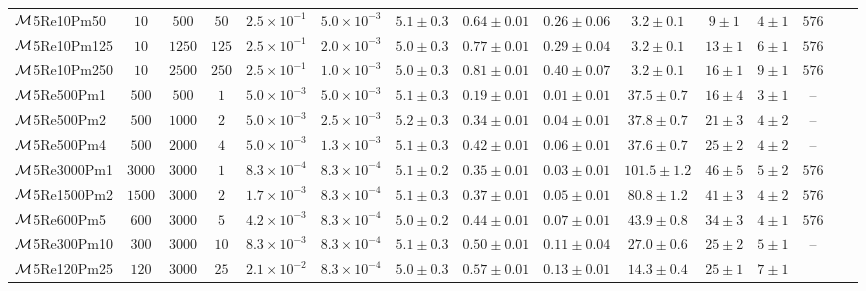 \begin{table}
{{\begin{threeparttable}
\begin{tabular}{l c c c c c c c c c c c c c c}
$\mathcal{M}$5Re10Pm50
	& $10$ & $500$ & $50$
	& $2.5 \times 10^{-1}$ & $5.0 \times 10^{-3}$ & $5.1 \pm 0.3$
	& $0.64 \pm 0.01$ & $0.26 \pm 0.06$
	& $3.2 \pm 0.1$ & $9 \pm 1$ & $4 \pm 1$
	& $576$ \\
$\mathcal{M}$5Re10Pm125
	& $10$ & $1250$ & $125$
	& $2.5 \times 10^{-1}$ & $2.0 \times 10^{-3}$ & $5.0 \pm 0.3$
	& $0.77 \pm 0.01$ & $0.29 \pm 0.04$
	& $3.2 \pm 0.1$ & $13 \pm 1$ & $6 \pm 1$
	& $576$ \\
$\mathcal{M}$5Re10Pm250
	& $10$ & $2500$ & $250$
	& $2.5 \times 10^{-1}$ & $1.0 \times 10^{-3}$ & $5.0 \pm 0.3$
	& $0.81 \pm 0.01$ & $0.40 \pm 0.07$
	& $3.2 \pm 0.1$ & $16 \pm 1$ & $9 \pm 1$
	& $576$ \\
$\mathcal{M}$5Re500Pm1
	& $500$ & $500$ & $1$
	& $5.0 \times 10^{-3}$ & $5.0 \times 10^{-3}$ & $5.1 \pm 0.3$
	& $0.19 \pm 0.01$ & $0.01 \pm 0.01$
	& $37.5 \pm 0.7$ & $16 \pm 4$ & $3 \pm 1$
	& -- \\
$\mathcal{M}$5Re500Pm2
	& $500$ & $1000$ & $2$
	& $5.0 \times 10^{-3}$ & $2.5 \times 10^{-3}$ & $5.2 \pm 0.3$
	& $0.34 \pm 0.01$ & $0.04 \pm 0.01$
	& $37.8 \pm 0.7$ & $21 \pm 3$ & $4 \pm 2$
	& -- \\
$\mathcal{M}$5Re500Pm4
	& $500$ & $2000$ & $4$
	& $5.0 \times 10^{-3}$ & $1.3 \times 10^{-3}$ & $5.1 \pm 0.3$
	& $0.42 \pm 0.01$ & $0.06 \pm 0.01$
	& $37.6 \pm 0.7$ & $25 \pm 2$ & $4 \pm 2$
	& -- \\
$\mathcal{M}$5Re3000Pm1
	& $3000$ & $3000$ & $1$
	& $8.3 \times 10^{-4}$ & $8.3 \times 10^{-4}$ & $5.1 \pm 0.2$
	& $0.35 \pm 0.01$ & $0.03 \pm 0.01$
	& $101.5 \pm 1.2$ & $46 \pm 5$ & $5 \pm 2$
	& $576$ \\
$\mathcal{M}$5Re1500Pm2
	& $1500$ & $3000$ & $2$
	& $1.7 \times 10^{-3}$ & $8.3 \times 10^{-4}$ & $5.1 \pm 0.3$
	& $0.37 \pm 0.01$ & $0.05 \pm 0.01$
	& $80.8 \pm 1.2$ & $41 \pm 3$ & $4 \pm 2$
	& $576$ \\
$\mathcal{M}$5Re600Pm5
	& $600$ & $3000$ & $5$
	& $4.2 \times 10^{-3}$ & $8.3 \times 10^{-4}$ & $5.0 \pm 0.2$
	& $0.44 \pm 0.01$ & $0.07 \pm 0.01$
	& $43.9 \pm 0.8$ & $34 \pm 3$ & $4 \pm 1$
	& $576$ \\
$\mathcal{M}$5Re300Pm10
	& $300$ & $3000$ & $10$
	& $8.3 \times 10^{-3}$ & $8.3 \times 10^{-4}$ & $5.1 \pm 0.3$
	& $0.50 \pm 0.01$ & $0.11 \pm 0.04$
	& $27.0 \pm 0.6$ & $25 \pm 2$ & $5 \pm 1$
	& -- \\
$\mathcal{M}$5Re120Pm25
	& $120$ & $3000$ & $25$
	& $2.1 \times 10^{-2}$ & $8.3 \times 10^{-4}$ & $5.0 \pm 0.3$
	& $0.57 \pm 0.01$ & $0.13 \pm 0.01$
	& $14.3 \pm 0.4$ & $25 \pm 1$ & $7 \pm 1$

\end{tabular}
\end{threeparttable}}}
\end{table}
